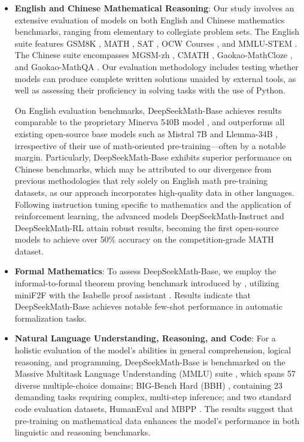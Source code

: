 \begin{itemize}[topsep=0pt]
    \item \textbf{English and Chinese Mathematical Reasoning}: Our study involves an extensive evaluation of models on both English and Chinese mathematics benchmarks, ranging from elementary to collegiate problem sets. The English suite features GSM8K \citep{gsm8k}, MATH \citep{MATH}, SAT \citep{llemma}, OCW Courses \citep{minerva}, and MMLU-STEM \citep{mmlu}. The Chinese suite encompasses MGSM-zh \citep{mgsm}, CMATH \citep{wei2023cmath}, Gaokao-MathCloze \citep{agieval}, and Gaokao-MathQA \citep{agieval}. Our evaluation methodology includes testing whether models can produce complete written solutions unaided by external tools, as well as assessing their proficiency in solving tasks with the use of Python.

On English evaluation benchmarks, DeepSeekMath-Base achieves results comparable to the proprietary Minerva 540B model \citep{minerva}, and outperforms all existing open-source base models such as Mistral 7B \citep{mistral} and Llemma-34B \citep{llemma}, irrespective of their use of math-oriented pre-training—often by a notable margin. Particularly, DeepSeekMath-Base exhibits superior performance on Chinese benchmarks, which may be attributed to our divergence from previous methodologies \citep{minerva,llemma} that rely solely on English math pre-training datasets, as our approach incorporates high-quality data in other languages. Following instruction tuning specific to mathematics and the application of reinforcement learning, the advanced models DeepSeekMath-Instruct and DeepSeekMath-RL attain robust results, becoming the first open-source models to achieve over 50\% accuracy on the competition-grade MATH dataset.

\item \textbf{Formal Mathematics}: To assess DeepSeekMath-Base, we employ the informal-to-formal theorem proving benchmark introduced by \citep{dsp_proof}, utilizing miniF2F \citep{minif2f} with the Isabelle proof assistant \citep{isabelle}. Results indicate that DeepSeekMath-Base achieves notable few-shot performance in automatic formalization tasks.
\item \textbf{Natural Language Understanding, Reasoning, and Code}: For a holistic evaluation of the model’s abilities in general comprehension, logical reasoning, and programming, DeepSeekMath-Base is benchmarked on the Massive Multitask Language Understanding (MMLU) suite \citep{mmlu}, which spans 57 diverse multiple-choice domains; BIG-Bench Hard (BBH) \citep{bbh}, containing 23 demanding tasks requiring complex, multi-step inference; and two standard code evaluation datasets, HumanEval \citep{codex} and MBPP \citep{mbpp}. The results suggest that pre-training on mathematical data enhances the model’s performance in both linguistic and reasoning benchmarks.


\end{itemize}

